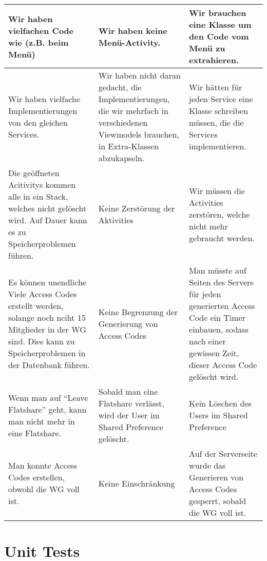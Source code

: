 \documentclass[a4paper]{scrreprt}
\begin{document}
\begin{flushleft}
\begin{longtable}{|p{}|p{}|p{}|}
\hline

{Wir haben vielfachen Code wie (z.B. beim Menü)} & {Wir haben keine Menü-Activity.} & {Wir brauchen eine Klasse um den Code vom Menü zu extrahieren.} \\

\hline

{Wir haben vielfache Implementierungen von den gleichen Services.} & {Wir haben nicht daran gedacht, die Implementierungen, die wir mehrfach in verschiedenen Viewmodels brauchen, in Extra-Klassen abzukapseln.} & {Wir hätten für jeden Service eine Klasse schreiben müssen, die die Services implementieren.} \\


\hline

{Die geöffneten Acitivitys kommen alle in ein Stack, welches nicht gelöscht wird. Auf Dauer kann es zu Speicherproblemen führen.} & {Keine Zerstörung der Aktivities } & {Wir müssen die Activities zerstören, welche nicht mehr gebraucht werden.} \\

\hline

{Es können unendliche Viele Access Codes erstellt werden, solange noch nciht 15 Mitglieder in der WG sind. Dies kann zu Speicherproblemen in der Datenbank führen.} & {Keine Begrenzung der Generierung von Access Codes} & {Man müsste auf Seiten des Servers für jeden generierten Access Code ein Timer einbauen, sodass nach einer gewissen Zeit, dieser Access Code gelöscht wird.} \\

\hline

{Wenn man auf “Leave Flatshare” geht, kann man nicht mehr in eine Flatshare.} & {Sobald man eine Flatshare verlässt, wird der User im Shared Preference gelöscht.} & {Kein Löschen des Users im Shared Preference} \\

\hline

{Man konnte Access Codes erstellen, obwohl die WG voll ist.} & {Keine Einschränkung} & {Auf der Serverseite wurde das Generieren von Access Codes gesperrt, sobald die WG voll ist.} \\

\hline

		\end{longtable}
	\end{flushleft}	
	
	\chapter{Unit Tests}
\end{document}
